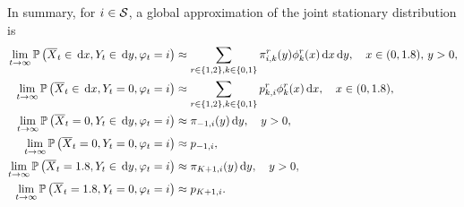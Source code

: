 In summary, for \(i\in\mathcal{S}\), a global approximation of the joint stationary distribution is
\begin{align*}
	\lim\limits_{t\to\infty}\mathbb{P}\left(\overline X_t \in \, \mathrm{d} x, Y_t \in \, \mathrm{d} y, \varphi_{t} = i\right) &\approx \displaystyle \sum_{r\in\{1,2\},k\in\{0,1\}}  {\pi}_{i,k}^r(y)\phi_k^r(x)\, \mathrm{d} x \, \mathrm{d} y ,\quad x\in(0,1.8),\, y>0, \\
	\lim\limits_{t\to\infty}\mathbb{P}\left(\overline X_t \in \, \mathrm{d} x, Y_t=0, \varphi_{t} = i\right) & \approx \displaystyle \sum_{r\in\{1,2\},k\in\{0,1\}}  {p}_{k,i}^r\phi_k^r(x)\, \mathrm{d} x ,\quad x\in(0,1.8),\\
	 \lim\limits_{t\to\infty}\mathbb{P}\left(\overline X_t =0, Y_t \in \, \mathrm{d} y, \varphi_{t} = i\right) & \approx{\pi}_{-1,i}(y)\, \mathrm{d} y,\quad y>0, \\
	 \lim\limits_{t\to\infty}\mathbb{P}\left(\overline X_t = 0, Y_t =0, \varphi_{t} = i\right) & \approx {p}_{-1,i},\quad \\ 
	 \lim\limits_{t\to\infty}\mathbb{P}\left(\overline X_t = 1.8, Y_t \in \, \mathrm{d} y, \varphi_{t} = i\right) & \approx {\pi}_{K+1,i}(y)\, \mathrm{d} y,\quad y>0, \\
	 \lim\limits_{t\to\infty}\mathbb{P}\left(\overline X_t = 1.8, Y_t = 0, \varphi_{t} = i\right) & \approx {p}_{K+1,i}.\quad
\end{align*}
